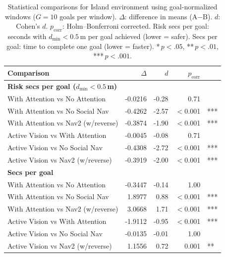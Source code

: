 \begin{table}[h]
\centering
\small
\begin{tabular}{lrrrl}
\toprule
\textbf{Comparison} & \textbf{$\Delta$} & \textbf{$d$} & \textbf{$p_{\mathrm{corr}}$} & \\
\midrule
\multicolumn{5}{l}{\textbf{Risk secs per goal ($d_{\min} < 0.5$\,m)}} \\
\quad With Attention vs No Attention & -0.0216 & -0.28 & 0.71 &  \\
\quad With Attention vs No Social Nav & -0.4262 & -2.57 & $<$0.001 & *** \\
\quad With Attention vs Nav2 (w/reverse) & -0.3874 & -1.90 & $<$0.001 & *** \\
\quad Active Vision vs With Attention & -0.0045 & -0.08 & 0.71 &  \\
\quad Active Vision vs No Social Nav & -0.4308 & -2.72 & $<$0.001 & *** \\
\quad Active Vision vs Nav2 (w/reverse) & -0.3919 & -2.00 & $<$0.001 & *** \\
\midrule
\multicolumn{5}{l}{\textbf{Secs per goal}} \\
\quad With Attention vs No Attention & -0.3447 & -0.14 & 1.00 &  \\
\quad With Attention vs No Social Nav & 1.8977 & 0.88 & $<$0.001 & *** \\
\quad With Attention vs Nav2 (w/reverse) & 3.0668 & 1.71 & $<$0.001 & *** \\
\quad Active Vision vs With Attention & -1.9112 & -0.95 & $<$0.001 & *** \\
\quad Active Vision vs No Social Nav & -0.0135 & -0.01 & 1.00 &  \\
\quad Active Vision vs Nav2 (w/reverse) & 1.1556 & 0.72 & 0.001 & ** \\
\bottomrule
\end{tabular}
\caption{Statistical comparisons for Island environment using goal-normalized windows ($G = 10$ goals per window). $\Delta$: difference in means (A$-$B). $d$: Cohen's $d$. $p_{\mathrm{corr}}$: Holm--Bonferroni corrected. Risk secs per goal: seconds with $d_{\min} < 0.5$\,m per goal achieved (lower = safer). Secs per goal: time to complete one goal (lower = faster). *\,$p < .05$, **\,$p < .01$, ***\,$p < .001$.}
\label{tab:stats_island}
\end{table}